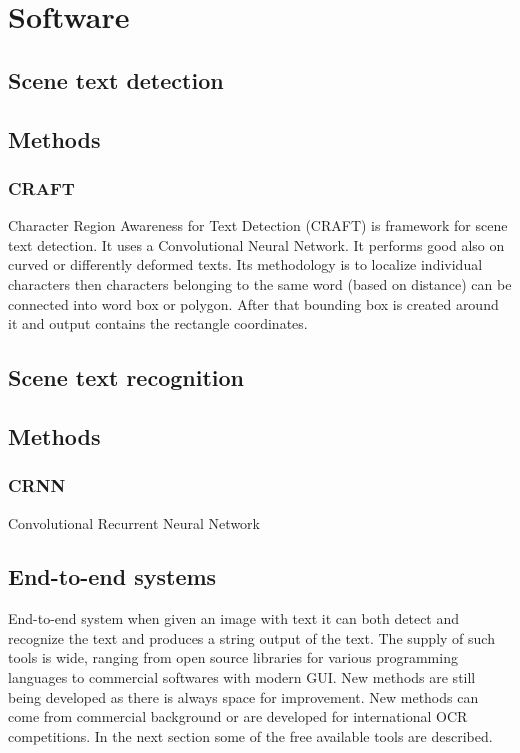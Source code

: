 \chapter{Software}

\section{Scene text detection}

\section*{Methods}
\subsection{CRAFT}

Character Region Awareness for Text Detection (CRAFT) is framework for scene text detection. It uses a Convolutional Neural Network. It performs good also on curved or differently deformed texts. Its methodology is to localize individual characters then characters belonging to the same word (based on distance) can be connected into word box or polygon. After that bounding box is created around it and output contains the rectangle coordinates.\cite{craft2}

\section{Scene text recognition}

\section*{Methods}
\subsection{CRNN}

Convolutional Recurrent Neural Network

\section{End-to-end systems}

End-to-end system when given an image with text it can both detect and recognize the text and produces a string output of the text. The supply of such tools is wide, ranging from open source libraries for various programming languages to commercial softwares with modern GUI. New methods are still being developed as there is always space for improvement. New methods can come from commercial background or are developed for international OCR competitions. In the next section some of the free available tools are described.

